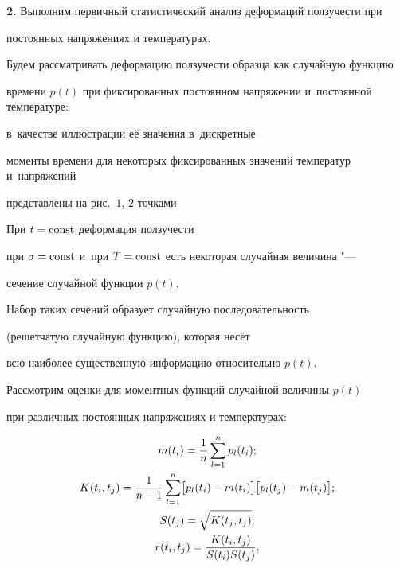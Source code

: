\textbf{2.} Выполним первичный статистический анализ деформаций ползучести при

постоянных напряжениях и температурах.



Будем рассматривать деформацию ползучести образца как случайную функцию

времени $p(t)$ при фиксированных постоянном напряжении и~постоянной температуре:

в~качестве иллюстрации её значения в~дискретные

моменты времени для некоторых фиксированных значений температур и~напряжений

представлены на рис.~$1$, $2$ точками.

При $t=\rm const$ деформация ползучести

при $\sigma =\rm const$ и~при $T= \rm const$ есть некоторая случайная величина "---

сечение случайной функции $p(t)$.

Набор таких сечений образует случайную последовательность

(решетчатую случайную функцию), которая несёт

всю наиболее существенную информацию относительно $p(t)$.



Рассмотрим оценки для моментных функций случайной величины $p(t)$

при различных постоянных напряжениях и температурах:

\begin{gather}


m(t_i )=\frac 1n \sum\limits_{l=1}^n p_l (t_i ) ;

\notag \\


K(t_i, t_j )=\frac 1{n-1}\sum\limits_{l=1}^n

\bigl[ p_l ( t_i )-m(t_i ) \bigr] \bigl[ p_l (t_j)-m(t_j ) \bigr] ;

\notag \\


S(t_j )=\sqrt {K(t_j , t_j )} ;

\notag \\

\label{gol:eq4}

r(t_i, t_j )=\frac{K(t_i, t_j )}{S(t_i)S(t_j )},

\end{gather}

